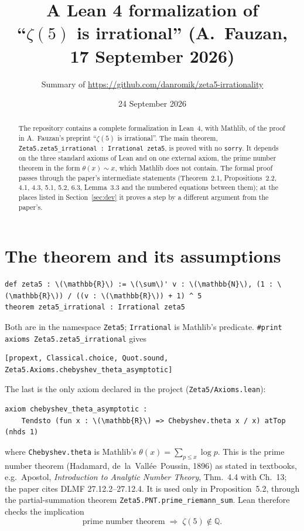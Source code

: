 \documentclass[11pt]{article}
\title{A Lean 4 formalization of\\ ``$\zeta(5)$ is irrational'' (A.\ Fauzan, 17 September 2026)}
\author{Summary of \url{https://github.com/danromik/zeta5-irrationality}}
\date{24 September 2026}
\newcommand{\lean}[1]{\texttt{#1}}
\begin{document}
\maketitle
\sloppy

\begin{abstract}
The repository contains a complete formalization in Lean~4, with Mathlib, of the proof in
A.~Fauzan's preprint ``$\zeta(5)$ is irrational''. The main theorem,
\lean{Zeta5.zeta5\_irrational : Irrational zeta5}, is proved with no \lean{sorry}. It depends on
the three standard axioms of Lean and on one external axiom, the prime number theorem in the
form $\theta(x)\sim x$, which Mathlib does not contain. The formal proof passes through the
paper's intermediate statements (Theorem~2.1, Propositions~2.2, 4.1, 4.3, 5.1, 5.2, 6.3,
Lemma~3.3 and the numbered equations between them); at the places listed in
Section~\ref{sec:dev} it proves a step by a different argument from the paper's.
\end{abstract}

\section{The theorem and its assumptions}

\begin{Verbatim}[fontsize=\small,frame=single,commandchars=\\\{\}]
def zeta5 : \(\mathbb{R}\) := \(\sum\)' v : \(\mathbb{N}\), (1 : \(\mathbb{R}\)) / ((v : \(\mathbb{R}\)) + 1) ^ 5
theorem zeta5_irrational : Irrational zeta5
\end{Verbatim}
\noindent Both are in the namespace \lean{Zeta5}; \lean{Irrational} is Mathlib's predicate.
 \lean{\#print axioms Zeta5.zeta5\_irrational} gives
\begin{Verbatim}[fontsize=\small,frame=single]
[propext, Classical.choice, Quot.sound, Zeta5.Axioms.chebyshev_theta_asymptotic]
\end{Verbatim}
\noindent The last is the only axiom declared in the project (\lean{Zeta5/Axioms.lean}):
\begin{Verbatim}[fontsize=\small,frame=single,commandchars=\\\{\}]
axiom chebyshev_theta_asymptotic :
    Tendsto (fun x : \(\mathbb{R}\) => Chebyshev.theta x / x) atTop (nhds 1)
\end{Verbatim}
\noindent where \lean{Chebyshev.theta} is Mathlib's $\theta(x)=\sum_{p\le x}\log p$. This is the
prime number theorem (Hadamard, de~la~Vall\'ee~Poussin, 1896) as stated in textbooks, e.g.\
Apostol, \emph{Introduction to Analytic Number Theory}, Thm.~4.4 with Ch.~13; the paper cites
DLMF 27.12.2--27.12.4. It is used only in Proposition~5.2, through the partial-summation
theorem \lean{Zeta5.PNT.prime\_riemann\_sum}. Lean therefore checks the implication
\[
  \text{prime number theorem} \;\Longrightarrow\; \zeta(5)\notin\mathbb{Q}.
\]
\end{document}
